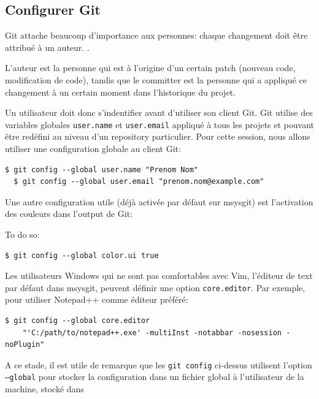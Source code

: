 \documentclass{../../common/tufte-latex/tufte-handout}
\begin{document}
\subsection{Configurer Git}

Git attache beaucoup d'importance aux personnes: chaque changement doit être attribué à un auteur. 
.

L'auteur est la personne qui est à l'origine d'un certain patch (nouveau code, modification de code), tandis que le committer est la personne qui a appliqué ce changement à un certain moment dans l'historique du projet.

Un utilisateur doit donc s'indentifier avant d'utiliser son client Git.
Git utilise des variables globales \texttt{user.name} et \texttt{user.email} appliqué à tous les projets et pouvant être redéfini au niveau d'un repository particulier.
Pour cette session, nous allons utiliser une configuration globale au client Git:

\begin{lstlisting}[style=BashInputStyle]
  $ git config --global user.name "Prenom Nom"
  $ git config --global user.email "prenom.nom@example.com"
\end{lstlisting}

Une autre configuration utile (déjà activée par défaut sur msysgit) est l'activation des couleurs dans l'output de Git:

\noindent To do so:

\begin{lstlisting}[style=BashInputStyle]
  $ git config --global color.ui true
\end{lstlisting}

Les utilisateurs Windows qui ne sont pas comfortables avec Vim, l'éditeur de text par défaut dans msysgit, peuvent définir une option \texttt{core.editor}.
Par exemple, pour utiliser Notepad++ comme éditeur préféré:

\begin{lstlisting}[style=BashInputStyle]
  $ git config --global core.editor
    "'C:/path/to/notepad++.exe' -multiInst -notabbar -nosession -noPlugin"
\end{lstlisting}

A ce stade, il est utile de remarque que les \texttt{git config} ci-dessus utilisent l'option \texttt{--global}  pour stocker la configuration dans un fichier global à l'utilisateur de la machine, stocké dans 
\end{document}
